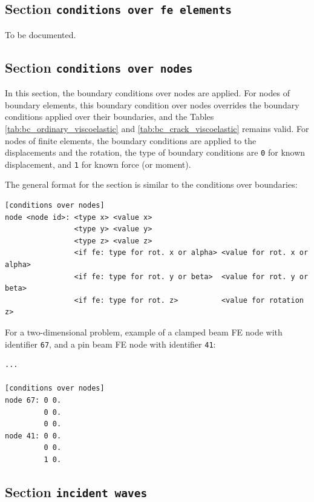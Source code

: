 \documentclass[a4paper,fleqn]{book}
\begin{document}
\subsection{Section \texttt{conditions over fe elements}}
\label{sec:conditions_fe_elements}

To be documented.

\subsection{Section \texttt{conditions over nodes}}
\label{sec:conditions_nodes}

In this section, the boundary conditions over nodes are applied. For nodes of boundary elements, this boundary condition over nodes overrides the boundary conditions applied over their boundaries, and the Tables \ref{tab:bc_ordinary_viscoelastic} and \ref{tab:bc_crack_viscoelastic} remains valid. For nodes of finite elements, the boundary conditions are applied to the displacements and the rotation, the type of boundary conditions are \texttt{0} for known displacement, and \texttt{1} for known force (or moment).

The general format for the section is similar to the conditions over boundaries:
\begin{Verbatim}[frame=single, fontsize=\small, label={general format of section [conditions over nodes]}]
[conditions over nodes]
node <node id>: <type x> <value x>
                <type y> <value y>
                <type z> <value z>
                <if fe: type for rot. x or alpha> <value for rot. x or alpha>
                <if fe: type for rot. y or beta>  <value for rot. y or beta>
                <if fe: type for rot. z>          <value for rotation z>
\end{Verbatim} 

For a two-dimensional problem, example of a clamped beam FE node with identifier \texttt{67}, and a pin beam FE node with identifier \texttt{41}: 
\begin{Verbatim}[frame=single, fontsize=\small, label={input.dat}]
...

[conditions over nodes]
node 67: 0 0.
         0 0.
         0 0.
node 41: 0 0.
         0 0.
         1 0.
\end{Verbatim} 

\subsection{Section \texttt{incident waves}}
\label{sec:incident_waves}
\end{document}
